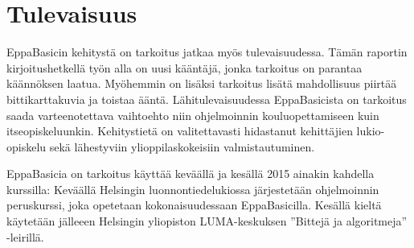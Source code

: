 \section{Tulevaisuus}
EppaBasicin kehitystä on tarkoitus
jatkaa myös tulevaisuudessa.
Tämän raportin kirjoitushetkellä työn alla
on uusi kääntäjä,
jonka tarkoitus on parantaa käännöksen laatua.
Myöhemmin on lisäksi tarkoitus lisätä
mahdollisuus piirtää bittikarttakuvia
ja toistaa ääntä.
Lähitulevaisuudessa EppaBasicista on tarkoitus
saada varteenotettava vaihtoehto niin ohjelmoinnin
kouluopettamiseen kuin itseopiskeluunkin.
Kehitystietä on valitettavasti hidastanut kehittäjien
lukio-opiskelu sekä lähestyviin ylioppilaskokeisiin
valmistautuminen.

EppaBasicia on tarkoitus käyttää keväällä
ja kesällä 2015 ainakin kahdella kurssilla:
Keväällä Helsingin luonnontiedelukiossa
järjestetään ohjelmoinnin peruskurssi,
joka opetetaan kokonaisuudessaan
EppaBasicilla.
Kesällä kieltä käytetään jälleeen
Helsingin yliopiston LUMA-keskuksen
''Bittejä ja algoritmeja'' -leirillä.
